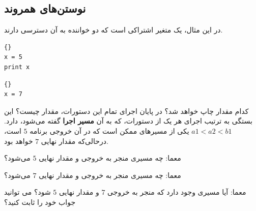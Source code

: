 \documentclass{book}
\begin{document}
\subsection {نوستن‌های همروند}
در این مثال،  یک متغیر اشتراکی است که دو خواننده به آن دسترسی دارند. 

\begin{latin}
\begin{minipage}[t]{2in}
\begin{latin}
\begin{lstlisting}[title=\rl{نخ \lr{A}}]{}
x = 5
print x
\end{lstlisting}
\end{latin}
\end{minipage}
\hfill
\begin{minipage}[t]{2in}
\begin{latin}
\begin{lstlisting}[title=\rl{نخ \lr{B}}]{}
x = 7
\end{lstlisting}
\end{latin}
\end{minipage}
\end{latin}


کدام مقدار  چاپ خواهد شد؟ در پایان اجرای تمام این دستورات، مقدار  چیست؟ 
این بستگی به ترتیب اجرای هر یک از دستورات، که به آن \textbf{مسیر اجرا} گفته می‌شود، دارد. 
$a1 < a2 < b1$ یکی از مسیرهای ممکن است که در آن خروجی برنامه 
\texttt{$5$} است، درحالی‌که مقدار نهایی \texttt{$7$} خواهد بود. 


معما: چه مسیری منجر به خروجی و مقدار نهایی \texttt{$5$} می‌شود؟


معما: چه مسیری منجر به خروجی و مقدار نهایی \texttt{$7$} می‌شود؟

معما: آیا مسیری وجود دارد که منجر به خروجی \texttt{$7$} و مقدار نهایی \texttt{$5$} شود؟ می توانید جواب خود را ثابت کنید؟
\end{document}
